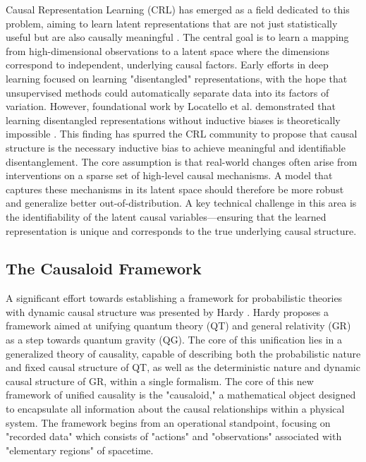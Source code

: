 {{Causal Representation Learning (CRL) has emerged as a field dedicated to this problem, aiming to learn latent representations that are not just statistically useful but are also causally meaningful \cite{Scholkopf2021Toward}. The central goal is to learn a mapping from high-dimensional observations to a latent space where the dimensions correspond to independent, underlying causal factors.
Early efforts in deep learning focused on learning "disentangled" representations, with the hope that unsupervised methods could automatically separate data into its factors of variation. However, foundational work by Locatello et al. demonstrated that learning disentangled representations without inductive biases is theoretically impossible \cite{Locatello2019Challenging}. This finding has spurred the CRL community to propose that causal structure is the necessary inductive bias to achieve meaningful and identifiable disentanglement. The core assumption is that real-world changes often arise from interventions on a sparse set of high-level causal mechanisms. A model that captures these mechanisms in its latent space should therefore be more robust and generalize better out-of-distribution. A key technical challenge in this area is the identifiability of the latent causal variables—ensuring that the learned representation is unique and corresponds to the true underlying causal structure. 

\subsection{The Causaloid Framework}

A significant effort towards establishing a framework for probabilistic theories with dynamic causal structure was presented by Hardy \cite{hardy2005probability}. Hardy proposes a framework aimed at unifying quantum theory (QT) and general relativity (GR) as a step towards quantum gravity (QG). The core of this unification lies in a generalized theory of causality, capable of describing both the probabilistic nature and fixed causal structure of QT, as well as the deterministic nature and dynamic causal structure of GR, within a single formalism. The core of this new framework of unified causality is the "causaloid," a mathematical object designed to encapsulate all information about the causal relationships within a physical system. The framework begins from an operational standpoint, focusing on "recorded data" which consists of "actions" and "observations" associated with "elementary regions" of spacetime.

}}
